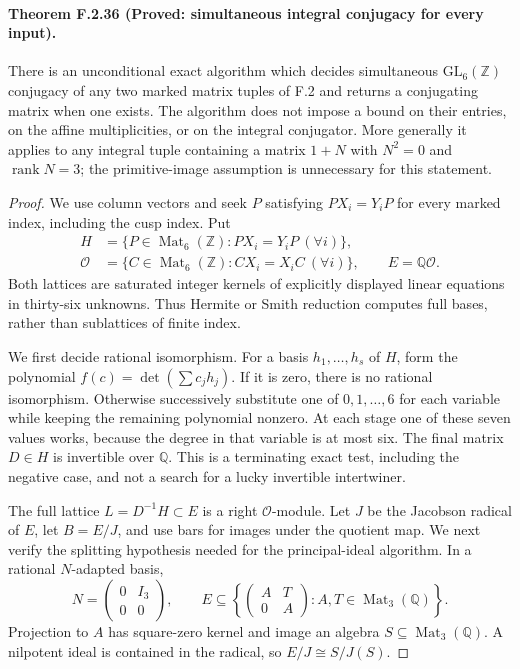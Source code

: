 \paragraph{Theorem F.2.36 (Proved: simultaneous integral conjugacy for every input).}
There is an unconditional exact algorithm which decides simultaneous
$\mathrm{GL}_6(\mathbb Z)$ conjugacy of any two marked matrix tuples of
F.2 and returns a conjugating matrix when one exists. The algorithm
does not impose a bound on their entries, on the affine multiplicities,
or on the integral conjugator. More generally it applies to any integral
tuple containing a matrix $1+N$ with $N^2=0$ and $\operatorname{rank}N=3$;
the primitive-image assumption is unnecessary for this statement.

\begin{proof}
We use column vectors and seek $P$ satisfying $PX_i=Y_iP$ for every
marked index, including the cusp index. Put
\[
\begin{aligned}
 H&=\{P\in\operatorname{Mat}_6(\mathbb Z):PX_i=Y_iP\ (\forall i)\},\\
 \mathcal O&=\{C\in\operatorname{Mat}_6(\mathbb Z):CX_i=X_iC\ (\forall i)\},
 \qquad E=\mathbb Q\mathcal O.
\end{aligned}                                                    \tag{F.IC1}
\]
Both lattices are saturated integer kernels of explicitly displayed
linear equations in thirty-six unknowns. Thus Hermite or Smith
reduction computes full bases, rather than sublattices of finite index.

We first decide rational isomorphism. For a basis $h_1,\ldots,h_s$ of
$H$, form the polynomial $f(c)=\det(\sum c_jh_j)$. If it is zero,
there is no rational isomorphism. Otherwise successively substitute
one of $0,1,\ldots,6$ for each variable while keeping the remaining
polynomial nonzero. At each stage one of these seven values works,
because the degree in that variable is at most six. The final matrix
$D\in H$ is invertible over $\mathbb Q$. This is a terminating exact
test, including the negative case, and not a search for a lucky
invertible intertwiner.

The full lattice $L=D^{-1}H\subset E$ is a right $\mathcal O$-module.
Let $J$ be the Jacobson radical of $E$, let $B=E/J$, and use bars
for images under the quotient map. We next verify the splitting
hypothesis needed for the principal-ideal algorithm. In a rational
$N$-adapted basis,
\[
 N=\begin{pmatrix}0&I_3\\0&0\end{pmatrix},\qquad
 E\subseteq
 \left\{\begin{pmatrix}A&T\\0&A\end{pmatrix}:A,T\in
                                      \operatorname{Mat}_3(\mathbb Q)\right\}.
                                                               \tag{F.IC2}
\]
Projection to $A$ has square-zero kernel and image an algebra
$S\subseteq\operatorname{Mat}_3(\mathbb Q)$. A nilpotent ideal is
contained in the radical, so $E/J\cong S/J(S)$.


\end{proof}
